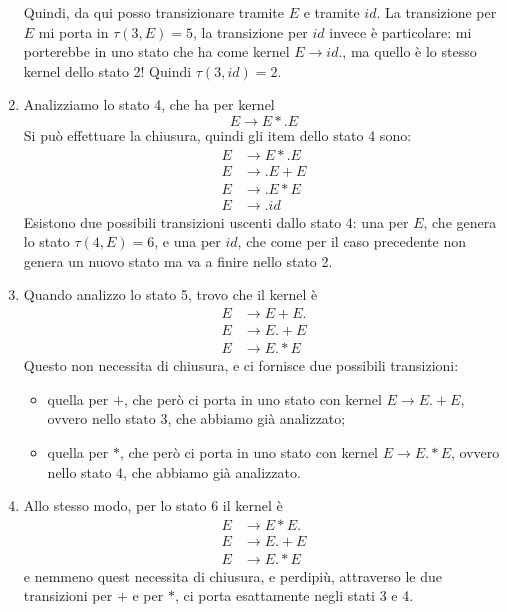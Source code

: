 \documentclass[class=book, crop=false, oneside, 12pt]{standalone}
\begin{document}
\begin{enumerate}
    Quindi, da qui posso transizionare tramite \(E\) e tramite \(id\). La transizione per \(E\) mi porta in \(\tau(3,E)=5\), la transizione per \(id\) invece è particolare: mi porterebbe in uno stato che ha come kernel \(E \to id.\), ma quello è lo stesso kernel dello stato 2! Quindi \(\tau(3,id)=2\).
    \item Analizziamo lo stato 4, che ha per kernel
    \begin{equation*}
        E \to E*.E 
    \end{equation*}
    Si può effettuare la chiusura, quindi gli item dello stato 4 sono:
    \begin{align*}
        E &\to E*.E \\ 
        E &\to .E+E \\
        E &\to .E*E \\
        E &\to .id
    \end{align*}
    Esistono due possibili transizioni uscenti dallo stato 4: una per \(E\), che genera lo stato \(\tau(4,E)=6\), e una per \(id\), che come per il caso precedente non genera un nuovo stato ma va a finire nello stato 2.
    \item Quando analizzo lo stato 5, trovo che il kernel è
    \begin{align*}
        E &\to E+E. \\
        E &\to E.+E \\
        E &\to E.*E
    \end{align*}
    Questo non necessita di chiusura, e ci fornisce due possibili transizioni:
    \begin{itemize}
        \item quella per \(+\), che però ci porta in uno stato con kernel \({E \to E.+E}\), ovvero nello stato 3, che abbiamo già analizzato;
        \item quella per \(*\), che però ci porta in uno stato con kernel \({E \to E.*E}\), ovvero nello stato 4, che abbiamo già analizzato.
    \end{itemize}
    \item Allo stesso modo, per lo stato 6 il kernel è
    \begin{align*}
        E &\to E*E. \\
        E &\to E.+E \\
        E &\to E.*E
    \end{align*}
    e nemmeno quest necessita di chiusura, e perdipiù, attraverso le due transizioni per \(+\) e per \(*\), ci porta esattamente negli stati 3 e 4.
\end{enumerate}
\end{document}
